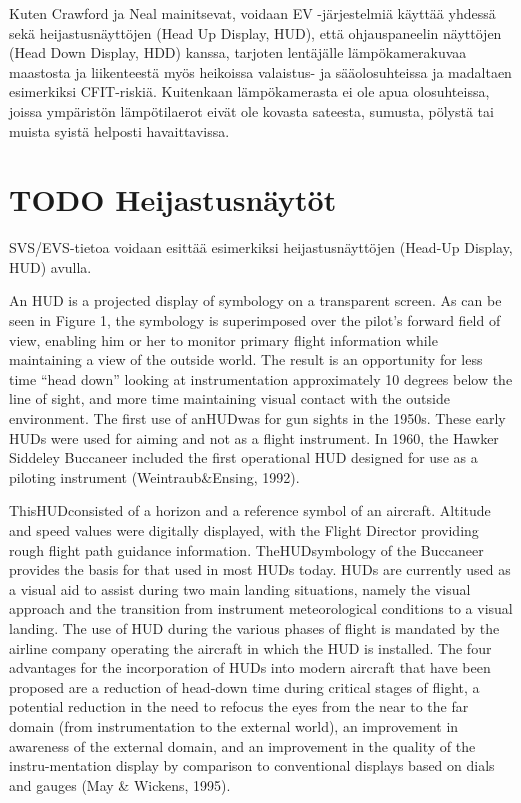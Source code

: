 \documentclass[utf8,bachelor,manualbib]{gradu3}
\begin{document}
Kuten Crawford ja Neal \citeyearpar{crawfordneal2006} mainitsevat, voidaan EV -järjestelmiä käyttää yhdessä sekä heijastusnäyttöjen (Head Up Display, HUD), että ohjauspaneelin näyttöjen (Head Down Display, HDD) kanssa, tarjoten lentäjälle lämpökamerakuvaa maastosta ja liikenteestä myös heikoissa valaistus- ja sääolosuhteissa ja madaltaen esimerkiksi CFIT-riskiä. Kuitenkaan lämpökamerasta ei ole apua olosuhteissa, joissa ympäristön lämpötilaerot eivät ole kovasta sateesta, sumusta, pölystä tai muista syistä helposti havaittavissa.

\section{TODO Heijastusnäytöt}

SVS/EVS-tietoa voidaan esittää esimerkiksi heijastusnäyttöjen (Head-Up Display, HUD) avulla.

An HUD is a projected display of symbology on a transparent screen. As can be
seen in Figure 1, the symbology is superimposed over the pilot’s forward field
of view, enabling him or her to monitor primary flight information while maintaining
a view of the outside world. The result is an opportunity for less time
“head down” looking at instrumentation approximately 10 degrees below the line of
sight, and more time maintaining visual contact with the outside environment.
The first use of anHUDwas for gun sights in the 1950s. These early HUDs were
used for aiming and not as a flight instrument. In 1960, the Hawker Siddeley Buccaneer
included the first operational HUD designed for use as a piloting instrument
(Weintraub\&Ensing, 1992).

ThisHUDconsisted of a horizon and a reference symbol
of an aircraft. Altitude and speed values were digitally displayed, with the Flight
Director providing rough flight path guidance information. TheHUDsymbology of
the Buccaneer provides the basis for that used in most HUDs today.
HUDs are currently used as a visual aid to assist during two main landing situations,
namely the visual approach and the transition from instrument meteorological
conditions to a visual landing. The use of HUD during the various phases of
flight is mandated by the airline company operating the aircraft in which the HUD
is installed. The four advantages for the incorporation of HUDs into modern aircraft
that have been proposed are a reduction of head-down time during critical
stages of flight, a potential reduction in the need to refocus the eyes from the near
to the far domain (from instrumentation to the external world), an improvement in
awareness of the external domain, and an improvement in the quality of the instru-mentation display by comparison to conventional displays based on dials and
gauges (May \& Wickens, 1995).
\end{document}
